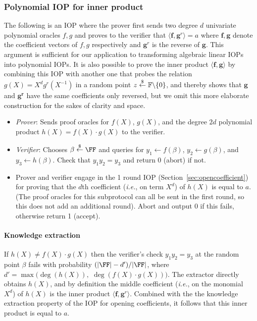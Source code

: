  

\subsubsection{Polynomial IOP for inner product}\label{sec:innerproduct}
The following is an IOP where the prover first sends two degree $d$ univariate polynomial oracles $f, g$ and proves to the verifier that $\langle \mathbf{f}, \mathbf{g}^r \rangle = a$ where $\mathbf{f}, \mathbf{g}$ denote the coefficient vectors of $f, g$ respectively and $\mathbf{g}^r$ is the reverse of $\mathbf{g}$. This argument is sufficient for our application to transforming algebraic linear IOPs into polynomial IOPs. It is also possible to prove the inner product $\langle \mathbf{f}, \mathbf{g} \rangle$ by combining this IOP with another one that probes the relation $g(X) = X^dg^r(X^{-1})$ in a random point $z \overset{\$}{\gets} \mathbb{F} \backslash \{0\}$, and thereby shows that $\mathbf{g}$ and $\mathbf{g^r}$ have the same coefficients only reversed, but we omit this more elaborate construction for the sakes of clarity and space.

\begin{itemize}
\item \emph{Prover}: Sends proof oracles for $f(X)$, $g(X)$, and the degree $2d$ polynomial product $h(X) = f(X)\cdot g(X)$ to the verifier. 
\item \emph{Verifier}: Chooses $\beta \sample \FF$ and queries for $y_1 \leftarrow f(\beta)$, $y_2 \leftarrow g(\beta)$, and $y_3 \leftarrow h(\beta)$. Check that $y_1 y_2 = y_3$ and return $0$ (abort) if not.
\item Prover and verifier engage in the 1 round IOP (Section~\ref{sec:opencoefficient}) for proving that the $d$th coefficient (\emph{i.e.}, on term $X^d$) of $h(X)$ is equal to $a$. (The proof oracles for this subprotocol can all be sent in the first round, so this does not add an additional round). Abort and output $0$ if this fails, otherwise return 1 (accept). 
\end{itemize}

\paragraph{Knowledge extraction} If $h(X) \neq f(X) \cdot g(X)$ then the verifier's check $y_1 y_2 = y_3$ at the random point $\beta$ fails with probability $(|\FF| - d')/|\FF|$, where $d' = \max(\deg(h(X)),$ $\deg(f(X)\cdot{}g(X)))$. The extractor directly obtains $h(X)$, and by definition the middle coefficient (\emph{i.e.}, on the monomial $X^d$) of $h(X)$ is the inner product $\langle \mathbf{f}, \mathbf{g}^r \rangle$. Combined with the the knowledge extraction property of the IOP for opening coefficients, it follows that this inner product is equal to $a$.  

